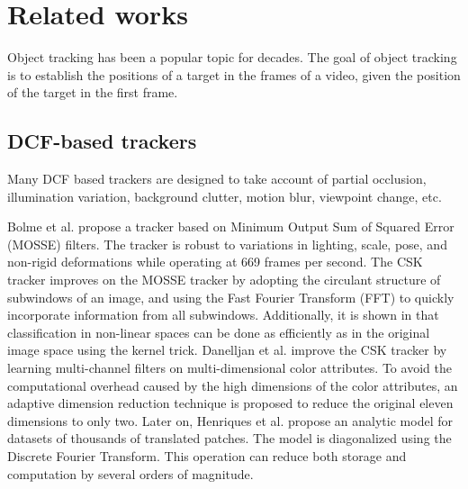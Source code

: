 \section{Related works}
Object tracking has been a popular topic for decades. The goal of object tracking is to establish the positions of a target in the frames of a video, given the position of the target in the first frame.

\subsection{DCF-based trackers}
Many DCF based trackers are designed to take account of partial occlusion, illumination variation, background clutter, motion blur, viewpoint change, etc.

Bolme et al. propose a tracker \cite{bolme2010visual} based on Minimum Output Sum of Squared Error (MOSSE) filters. The tracker is robust to variations in lighting, scale, pose, and non-rigid deformations while operating at 669 frames per second.
The CSK tracker \cite{Henriques2012ExploitingTC} improves on the MOSSE tracker by adopting the circulant structure of subwindows of an image, and using the Fast Fourier Transform (FFT) to quickly incorporate information from all subwindows. Additionally, it is shown in \cite{Henriques2012ExploitingTC} that classification in non-linear spaces can be done as efficiently as in the original image space using the kernel trick.
Danelljan et al. \cite{Danelljan2014AdaptiveCA} improve the CSK tracker by learning multi-channel filters on multi-dimensional color attributes. To avoid the computational overhead caused by the high dimensions of the color attributes, an adaptive dimension reduction technique is proposed \cite{Danelljan2014AdaptiveCA} to reduce the original eleven dimensions to only two.
Later on, Henriques et al. \cite{henriques2014high-speed} propose an analytic model for datasets of thousands of translated patches. The model is diagonalized using the Discrete Fourier Transform. This operation can reduce both storage and computation by several orders of magnitude.


